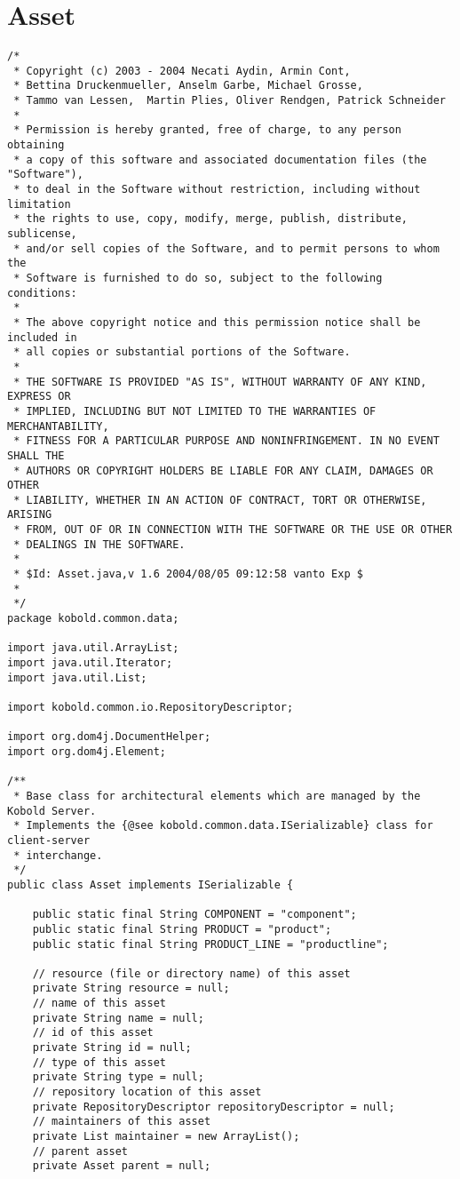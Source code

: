 \section{Asset}
\small \begin{verbatim}
/*
 * Copyright (c) 2003 - 2004 Necati Aydin, Armin Cont, 
 * Bettina Druckenmueller, Anselm Garbe, Michael Grosse, 
 * Tammo van Lessen,  Martin Plies, Oliver Rendgen, Patrick Schneider
 * 
 * Permission is hereby granted, free of charge, to any person obtaining
 * a copy of this software and associated documentation files (the "Software"),
 * to deal in the Software without restriction, including without limitation
 * the rights to use, copy, modify, merge, publish, distribute, sublicense, 
 * and/or sell copies of the Software, and to permit persons to whom the 
 * Software is furnished to do so, subject to the following conditions:
 *
 * The above copyright notice and this permission notice shall be included in 
 * all copies or substantial portions of the Software.
 *
 * THE SOFTWARE IS PROVIDED "AS IS", WITHOUT WARRANTY OF ANY KIND, EXPRESS OR 
 * IMPLIED, INCLUDING BUT NOT LIMITED TO THE WARRANTIES OF MERCHANTABILITY, 
 * FITNESS FOR A PARTICULAR PURPOSE AND NONINFRINGEMENT. IN NO EVENT SHALL THE 
 * AUTHORS OR COPYRIGHT HOLDERS BE LIABLE FOR ANY CLAIM, DAMAGES OR OTHER 
 * LIABILITY, WHETHER IN AN ACTION OF CONTRACT, TORT OR OTHERWISE, ARISING 
 * FROM, OUT OF OR IN CONNECTION WITH THE SOFTWARE OR THE USE OR OTHER 
 * DEALINGS IN THE SOFTWARE.
 *
 * $Id: Asset.java,v 1.6 2004/08/05 09:12:58 vanto Exp $
 *
 */
package kobold.common.data;

import java.util.ArrayList;
import java.util.Iterator;
import java.util.List;

import kobold.common.io.RepositoryDescriptor;

import org.dom4j.DocumentHelper;
import org.dom4j.Element;

/**
 * Base class for architectural elements which are managed by the Kobold Server.
 * Implements the {@see kobold.common.data.ISerializable} class for client-server
 * interchange.
 */
public class Asset implements ISerializable {

	public static final String COMPONENT = "component";
	public static final String PRODUCT = "product";
	public static final String PRODUCT_LINE = "productline";

	// resource (file or directory name) of this asset
	private String resource = null;
	// name of this asset
	private String name = null;
	// id of this asset
	private String id = null;
	// type of this asset
	private String type = null;
	// repository location of this asset
	private RepositoryDescriptor repositoryDescriptor = null;
	// maintainers of this asset
	private List maintainer = new ArrayList();
	// parent asset
	private Asset parent = null;
	

\end{verbatim}
